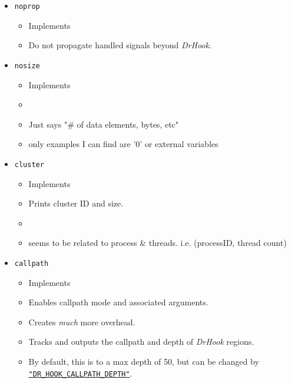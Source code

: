 \begin{itemize}
    \item\verb+noprop+
    \begin{itemize}
        \item[] Implements
        \item Do not propagate handled signals beyond \textit{DrHook}.
    \end{itemize}
    \item\verb+nosize+
    \begin{itemize}
        \item[] Implements
        \item {}
        \item Just says "\# of data elements, bytes, etc"
        \item only examples I can find are '0' or external variables
    \end{itemize}
    \item\verb+cluster+
    \begin{itemize}
        \item[] Implements
        \item Prints cluster ID and size.
        \item {}
        \item seems to be related to process \& threads. i.e. (processID, thread count)
    \end{itemize}
    \item\verb+callpath+
    \begin{itemize}
        \item[] Implements
        \item Enables callpath mode and associated arguments.
        \item Creates \textit{much} more overhead.
        \item Tracks and outputs the callpath and depth of \textit{DrHook} regions.
        \item By default, this is to a max depth of 50, but can be changed by \hyperref[section:flags:DR_HOOK_CALLPATH_DEPTH]{\texttt{"DR\_HOOK\_CALLPATH\_DEPTH"}}.
    \end{itemize}
\end{itemize}


